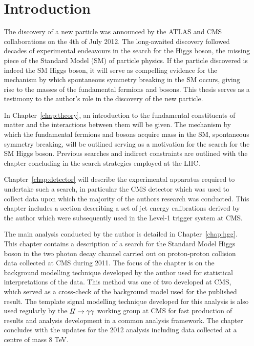 \section{Introduction}
\label{introduction}

The discovery of a new particle was announced by the ATLAS and CMS
collaborations on the 4th of July 2012. The long-awaited discovery 
followed decades of experimental endeavours in the search for the
Higgs boson, the missing piece of the Standard Model (SM) of particle physics.
If the particle discovered is indeed the SM Higgs boson, 
it will serve as compelling evidence for the mechanism by which
spontaneous symmetry breaking in the SM occurs, giving rise
to the masses of the fundamental fermions and bosons. 
This thesis serves as a testimony to the author's role in the 
discovery of the new particle.

In Chapter~\ref{chap:theory}, an introduction to the fundamental constituents of
matter and the interactions between them will be given. The mechanism by which 
the fundamental fermions and bosons acquire mass in the SM, spontaneous symmetry breaking,
will be outlined serving as a motivation for the search for the SM Higgs boson. 
Previous searches and indirect constraints are outlined with the chapter concluding in
the search strategies employed at the LHC.

Chapter~\ref{chap:detector} will describe the experimental apparatus required to undertake 
such a search, in particular the CMS detector which was used to collect data upon which 
the majority of the authors research was conducted. This chapter includes a section describing 
a set of jet energy calibrations derived by the author which were subsequently used  
in the Level-1 trigger system at CMS.

The main analysis conducted by the author is detailed in Chapter~\ref{chap:hgg}. This chapter 
contains a description of a search for the Standard Model Higgs boson in the two
photon decay channel carried out on proton-proton collision data collected at CMS during 2011.
The focus of the chapter is on the background modelling technique developed by the author
used for statistical interpretations of the data. This method was one of two developed at CMS, 
which served as a cross-check of the background model used for the published result. 
The template signal modelling technique developed for this analysis is also used regularly by the $H\rightarrow\gamma\gamma$
working group at CMS for fast production of results and analysis development in a common analysis framework.
The chapter concludes with the updates for the 2012 analysis including data
collected at a centre of mass 8 TeV. 

